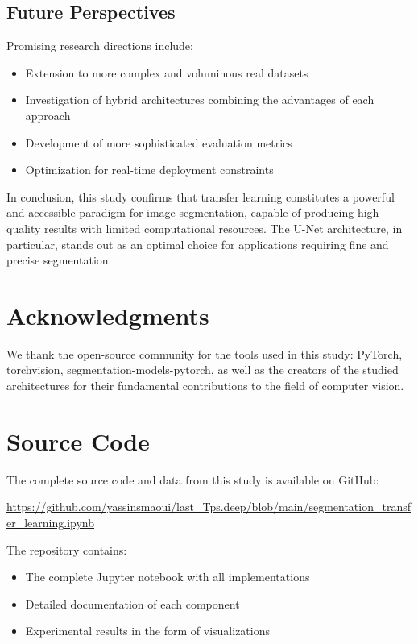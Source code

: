 \documentclass[12pt,a4paper]{article}
\begin{document}
\subsection{Future Perspectives}

Promising research directions include:
\begin{itemize}
    \item Extension to more complex and voluminous real datasets
    \item Investigation of hybrid architectures combining the advantages of each approach
    \item Development of more sophisticated evaluation metrics
    \item Optimization for real-time deployment constraints
\end{itemize}

In conclusion, this study confirms that transfer learning constitutes a powerful and accessible paradigm for image segmentation, capable of producing high-quality results with limited computational resources. The U-Net architecture, in particular, stands out as an optimal choice for applications requiring fine and precise segmentation.

\section*{Acknowledgments}

We thank the open-source community for the tools used in this study: PyTorch, torchvision, segmentation-models-pytorch, as well as the creators of the studied architectures for their fundamental contributions to the field of computer vision.




\appendix

\section{Source Code}

The complete source code and data from this study is available on GitHub: 

\url{https://github.com/yassinsmaoui/last_Tps.deep/blob/main/segmentation_transfer_learning.ipynb}

The repository contains:
\begin{itemize}
    \item The complete Jupyter notebook with all implementations
    \item Detailed documentation of each component
    \item Experimental results in the form of visualizations
\end{itemize}
\end{document}
